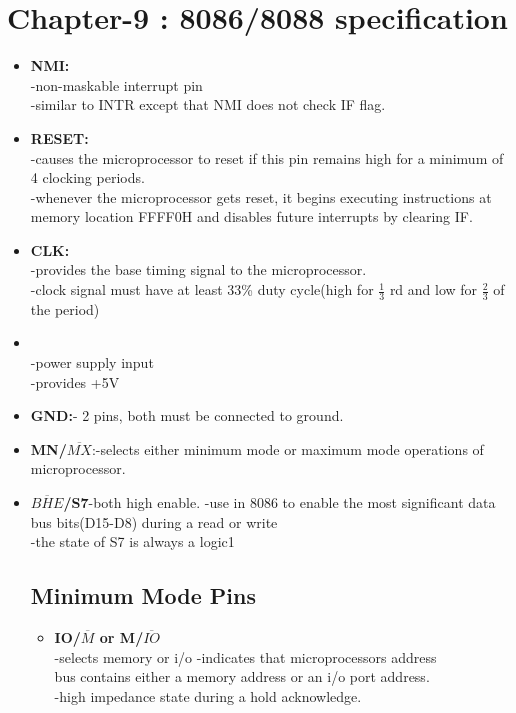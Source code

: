 \documentclass[12pt]{article}
\begin{document}
\section{Chapter-9 : 8086/8088 specification}
\begin{itemize}
	\item\textbf{NMI:}\\
	-non-maskable interrupt pin \\
	-similar to INTR except that NMI does not check IF flag.
	
	\item\textbf{RESET:}\\
	-causes the microprocessor to reset if this pin remains high for a minimum of 4 clocking periods.\\
	-whenever the microprocessor  gets reset, it begins executing instructions at memory location FFFF0H and disables future interrupts by clearing IF.
	
	\item\textbf{CLK:}\\
	-provides the base timing signal to the microprocessor.\\
	-clock signal must have at least 33\% duty cycle(high for $\frac{1}{3}$ rd and low for $\frac{2}{3}$ of the period)
	
	\item{}\\
	-power supply input\\
	-provides +5V
	
	\item\textbf{GND:}- 2 pins, both must be connected to ground.
	
	\item\textbf{MN/$\overline{MX}$}:-selects either minimum mode or maximum mode operations of microprocessor.
	
	\item\textbf{$\overline{BHE}$/S7}-both high enable.
	-use in 8086 to enable the most significant data bus bits(D15-D8) during a read or write\\
	-the state of S7 is always a logic1
	
	\subsection{Minimum Mode Pins}
	\begin{itemize}
		\item\textbf{IO/$\overline{M}$ or M/$\overline{IO}$}\\
		-selects memory or i/o 
		-indicates that microprocessors address\\ bus contains either a memory address or an i/o port address.\\
		-high impedance state during a hold acknowledge.
		

\end{itemize}
\end{itemize}
\end{document}
